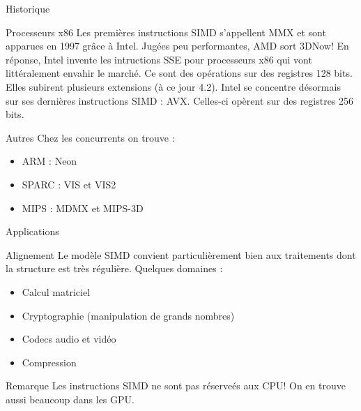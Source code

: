 \documentclass{beamer}
\begin{document}
\begin{frame}{Historique}
    \begin{block}{Processeurs x86}
    Les premières instructions SIMD s'appellent MMX et sont apparues en 1997
    grâce à Intel. Jugées peu performantes, AMD sort 3DNow!
\newline \newline
    En réponse, Intel invente les intructions SSE pour processeurs x86 qui vont 
    littéralement envahir le marché. Ce sont des opérations sur des registres 
    128 bits. Elles subirent plusieurs extensions (à ce jour 4.2). 
\newline \newline
    Intel se concentre désormais sur ses dernières instructions SIMD : AVX.
    Celles-ci opèrent sur des registres 256 bits.
    \end{block}

    \begin{block}{Autres}
    Chez les concurrents on trouve :
        \begin{itemize}
        \item ARM : Neon
        \item SPARC : VIS et VIS2
        \item MIPS : MDMX et MIPS-3D
        \end{itemize}
    \end{block}
\end{frame}


\begin{frame}{Applications}
    \begin{block}{Alignement}
    Le modèle SIMD convient particulièrement bien aux traitements dont la 
    structure est très régulière.
\newline \newline
    Quelques domaines :
        \begin{itemize}
        \item Calcul matriciel
        \item Cryptographie (manipulation de grands nombres)
        \item Codecs audio et vidéo
        \item Compression
        \end{itemize}
    \end{block}

    \begin{block}{Remarque}
    Les instructions SIMD ne sont pas réserveés aux CPU! On en trouve aussi
    beaucoup dans les GPU.
    \end{block}
\end{frame}
\end{document}
